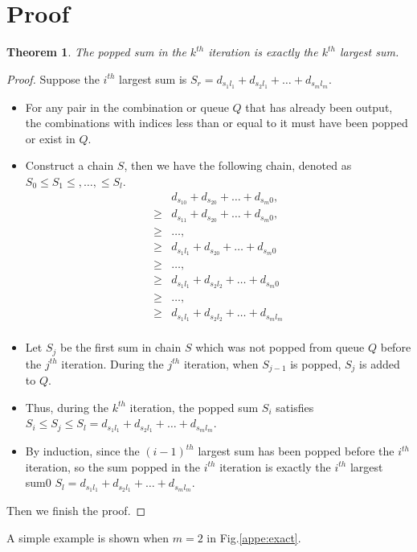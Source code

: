 \documentclass[lettersize,journal]{IEEEtran}
\newtheorem{theorem}{Theorem}[section]
\newtheorem{proof}{Proof}[section]
\begin{document}
\section{Proof}

\begin{theorem}
The popped sum in the $k^{th}$ iteration is exactly the $k^{th}$ largest sum.
\end{theorem}

\begin{proof}
Suppose the $i^{th}$ largest sum is $S_r = d_{s_1l_1}+d_{s_2l_1}+\ldots+d_{s_ml_m}$.
\begin{itemize}
\item For any pair in the combination or queue $Q$ that has already been output, the combinations with indices less than or equal to it must have been popped  or exist in $Q$.
\item   Construct a chain $S$, then we have the following chain, denoted as $S_0\leq S_1\leq ,\ldots,\leq S_l$.
\begin{equation*}
    \begin{aligned}
        &d_{s_10}+d_{s_20}+\ldots+d_{s_m0},\\
        \geq&d_{s_11}+d_{s_20}+\ldots+d_{s_m0},\\
        \geq &\ldots,\\
        \geq&d_{s_1l_1}+d_{s_20}+\ldots+d_{s_m0}\\
        \geq &\ldots,\\
        \geq&d_{s_1l_1}+d_{s_2l_2}+\ldots+d_{s_m0}\\
        \geq &\ldots,\\
        \geq&d_{s_1l_1}+d_{s_2l_2}+\ldots+d_{s_ml_m}\\
    \end{aligned}
\end{equation*}
\item Let $S_j$ be the first sum in chain $S$ which was not popped from queue $Q$ before the $j^{th}$ iteration. During the $j^{th}$ iteration, when $S_{j-1}$ is popped, $S_{j}$ is added to $Q$. 
\item Thus, during the $k^{th}$ iteration, the popped sum $S_i$ satisfies $S_i\leq S_j\leq S_l = d_{s_1 l_1}+d_{s_2l_1}+\ldots +d_{s_ml_m}$.
\item By induction, since the $(i-1)^{th}$ largest sum has been popped before the $i^{th}$ iteration,  so the sum popped in the $i^{th}$ iteration is exactly the $i^{th}$ largest sum0 $S_l = d_{s_1 l_1}+d_{s_2l_1}+\ldots +d_{s_ml_m}$.
\end{itemize}
Then we finish the proof.
\end{proof}
A simple example is shown when $m=2$ in Fig.\ref{appe:exact}.
\end{document}
